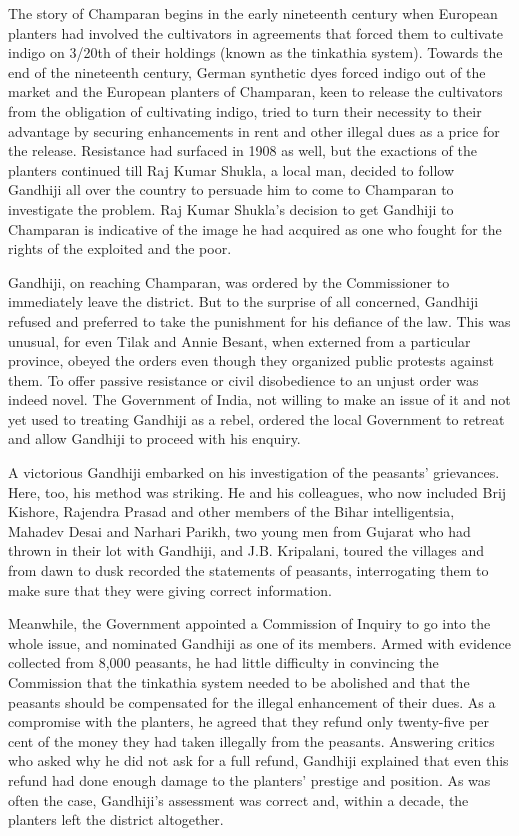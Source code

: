 \begin{multicols}{2}
The story of Champaran begins in the early nineteenth century when European planters had involved the cultivators in agreements that forced them to cultivate indigo on 3/20th of their holdings (known as the tinkathia system). Towards the end of the nineteenth century, German synthetic dyes forced indigo out of the market and the European planters of Champaran, keen to release the cultivators from the obligation of cultivating indigo, tried to turn their necessity to their advantage by securing enhancements in rent and other illegal dues as a price for the release. Resistance had surfaced in 1908 as well, but the exactions of the planters continued till Raj Kumar Shukla, a local man, decided to follow Gandhiji all over the country to persuade him to come to Champaran to investigate the problem. Raj Kumar Shukla's decision to get Gandhiji to Champaran is indicative of the image he had acquired as one who fought for the rights of the exploited and the poor.

Gandhiji, on reaching Champaran, was ordered by the Commissioner to immediately leave the district. But to the surprise of all concerned, Gandhiji refused and preferred to take the punishment for his defiance of the law. This was unusual, for even Tilak and Annie Besant, when externed from a particular province, obeyed the orders even though they organized public protests against them. To offer passive resistance or civil disobedience to an unjust order was indeed novel. The Government of India, not willing to make an issue of it and not yet used to treating Gandhiji as a rebel, ordered the local Government to retreat and allow Gandhiji to proceed with his enquiry.

A victorious Gandhiji embarked on his investigation of the peasants' grievances. Here, too, his method was striking. He and his colleagues, who now included Brij Kishore, Rajendra Prasad and other members of the Bihar intelligentsia, Mahadev Desai and Narhari Parikh, two young men from Gujarat who had thrown in their lot with Gandhiji, and J.B. Kripalani, toured the villages and from dawn to dusk recorded the statements of peasants, interrogating them to make sure that they were giving correct information.

Meanwhile, the Government appointed a Commission of Inquiry to go into the whole issue, and nominated Gandhiji as one of its members. Armed with evidence collected from 8,000 peasants, he had little difficulty in convincing the Commission that the tinkathia system needed to be abolished and that the peasants should be compensated for the illegal enhancement of their dues. As a compromise with the planters, he agreed that they refund only twenty-five per cent of the money they had taken illegally from the peasants. Answering critics who asked why he did not ask for a full refund, Gandhiji explained that even this refund had done enough damage to the planters' prestige and position. As was often the case, Gandhiji's assessment was correct and, within a decade, the planters left the district altogether.


\end{multicols}
